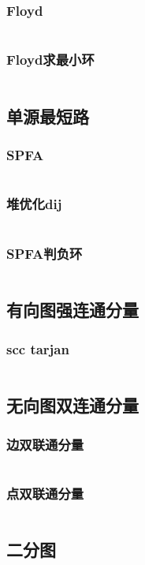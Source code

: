 \documentclass[a4paper,11pt]{article}
\begin{document}
\subsubsection{Floyd}
\inputminted[breaklines]{c++}{图论/多源最短路.cpp}
\subsubsection{Floyd求最小环}
\inputminted[breaklines]{c++}{图论/floyd求最小环.cpp}
\subsection{单源最短路}
\subsubsection{SPFA}
\inputminted[breaklines]{c++}{图论/spfa.cc}
\subsubsection{堆优化dij}
\inputminted[breaklines]{c++}{图论/堆优化dij.cpp}
\subsubsection{SPFA判负环}
\inputminted[breaklines]{c++}{图论/spfa判负环.cpp}

\subsection{有向图强连通分量}
\subsubsection{scc tarjan}
\inputminted[breaklines]{c++}{图论/scc_tarjan.cpp}
\subsection{无向图双连通分量}
\subsubsection{边双联通分量}
\inputminted[breaklines]{c++}{图论/边双联通分量.cpp}
\subsubsection{点双联通分量}
\inputminted[breaklines]{c++}{图论/点双联通分量.cpp}
\subsection{二分图}
\end{document}
